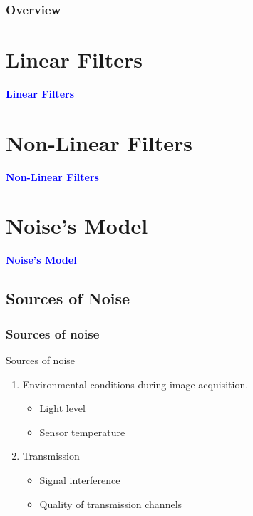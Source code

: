 \documentclass[english,11pt,table,handout]{beamer}
\date{09 September 2015}
\begin{document}
\begin{frame}
  \maketitle
\end{frame}

\begin{frame}\frametitle<presentation>{Overview}
  \tableofcontents
\end{frame}


\section{Linear Filters}
\frame
{
	\Huge
	\begin{center}
	\textcolor{blue}{\textbf{Linear Filters}}
	\end{center}
}
\section{Non-Linear Filters}
\frame
{
	\Huge
	\begin{center}
		\textcolor{blue}{\textbf{Non-Linear Filters}}
	\end{center}
}
\section{Noise's Model}
\frame
{
	\Huge
	\begin{center}
		\textcolor{blue}{\textbf{Noise's Model}}
	\end{center}
}
\subsection{Sources of Noise}
\frame
{
	\frametitle{Sources of noise}
	\begin{block}{Sources of noise}
		\begin{enumerate}
			\item Environmental conditions during image acquisition.
				\begin{itemize}
					\item Light level
					\item Sensor temperature
					
				\end{itemize}
			\item Transmission
				\begin{itemize}
					\item Signal interference
					\item Quality of transmission channels
					
				\end{itemize}
		\end{enumerate}
	\end{block}
}
\end{document}
